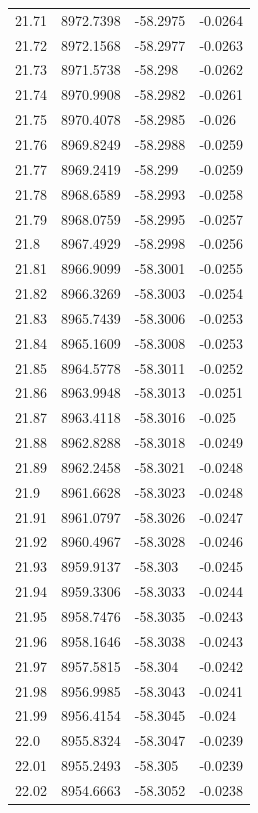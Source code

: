 \begin{table}[H]
\begin{tabular}{llll}
21.71 & 8972.7398 & -58.2975 & -0.0264 \\
21.72 & 8972.1568 & -58.2977 & -0.0263 \\
21.73 & 8971.5738 & -58.298 & -0.0262 \\
21.74 & 8970.9908 & -58.2982 & -0.0261 \\
21.75 & 8970.4078 & -58.2985 & -0.026 \\
21.76 & 8969.8249 & -58.2988 & -0.0259 \\
21.77 & 8969.2419 & -58.299 & -0.0259 \\
21.78 & 8968.6589 & -58.2993 & -0.0258 \\
21.79 & 8968.0759 & -58.2995 & -0.0257 \\
21.8 & 8967.4929 & -58.2998 & -0.0256 \\
21.81 & 8966.9099 & -58.3001 & -0.0255 \\
21.82 & 8966.3269 & -58.3003 & -0.0254 \\
21.83 & 8965.7439 & -58.3006 & -0.0253 \\
21.84 & 8965.1609 & -58.3008 & -0.0253 \\
21.85 & 8964.5778 & -58.3011 & -0.0252 \\
21.86 & 8963.9948 & -58.3013 & -0.0251 \\
21.87 & 8963.4118 & -58.3016 & -0.025 \\
21.88 & 8962.8288 & -58.3018 & -0.0249 \\
21.89 & 8962.2458 & -58.3021 & -0.0248 \\
21.9 & 8961.6628 & -58.3023 & -0.0248 \\
21.91 & 8961.0797 & -58.3026 & -0.0247 \\
21.92 & 8960.4967 & -58.3028 & -0.0246 \\
21.93 & 8959.9137 & -58.303 & -0.0245 \\
21.94 & 8959.3306 & -58.3033 & -0.0244 \\
21.95 & 8958.7476 & -58.3035 & -0.0243 \\
21.96 & 8958.1646 & -58.3038 & -0.0243 \\
21.97 & 8957.5815 & -58.304 & -0.0242 \\
21.98 & 8956.9985 & -58.3043 & -0.0241 \\
21.99 & 8956.4154 & -58.3045 & -0.024 \\
22.0 & 8955.8324 & -58.3047 & -0.0239 \\
22.01 & 8955.2493 & -58.305 & -0.0239 \\
22.02 & 8954.6663 & -58.3052 & -0.0238 \\

\end{tabular}
\end{table}
